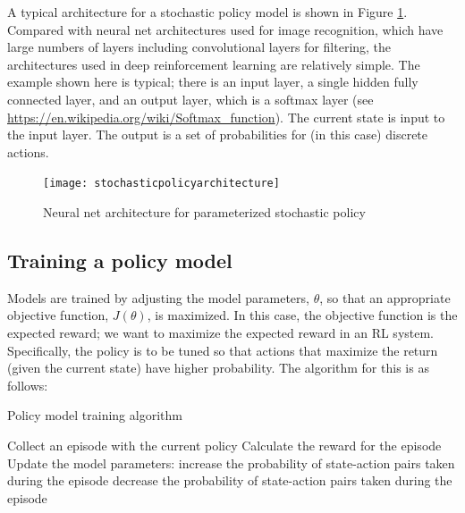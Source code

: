 \documentclass[acmlarge,screen]{acmart}
\begin{document}
A typical architecture for a stochastic policy model is shown in Figure \ref{fig:StochasticPolicyArchitecture11}.
Compared with neural net architectures used for image recognition, which have large numbers of layers including convolutional layers for filtering,
the architectures used in deep reinforcement learning are relatively simple.
The example shown here is typical;  there is an input layer, a single hidden fully connected layer, and an output layer, which is a softmax layer
(see \url{https://en.wikipedia.org/wiki/Softmax_function}).
The current state is input to the input layer.
The output is a set of probabilities for (in this case) discrete actions.


\begin{figure}[tb]
\centering 
\texttt{[image: stochasticpolicyarchitecture]} 
\caption[Stochastic policy architecture]{Neural net architecture for parameterized stochastic policy} %
\label{fig:StochasticPolicyArchitecture11} 
\end{figure}


\subsection{Training a policy model}

Models are trained by adjusting the model parameters, $\theta$, so that an appropriate objective function, $J(\theta)$, is maximized.
In this case, the objective function is the expected reward;  we want to maximize the expected reward in an RL system.
Specifically, the policy is to be tuned so that actions that maximize the return (given the current state) have higher probability.
The algorithm for this is as follows:

\begin{algorithm}
\caption{Policy model training algorithm}\label{alg:policytraining}
\begin{algorithmic}[1]
  \State Collect an episode with the current policy
  \State Calculate the reward for the episode
  \State Update the model parameters:
    \State increase the probability of state-action pairs taken during the episode
    \State decrease the probability of state-action pairs taken during the episode
  \EndIf
\end{algorithmic}
\end{algorithm}
\end{document}

